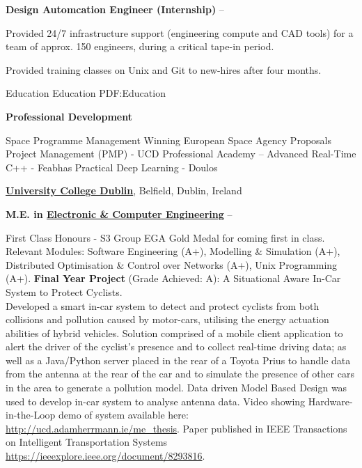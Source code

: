 \documentclass[letterpaper,MMMyyyy,nonstopmode]{simpleresumecv}
\begin{document}
\begin{Body}
\pagebreak

\BulletItem
\textbf{Design Automcation Engineer (Internship)}
\hfill
{} --
\begin{Detail}
\Gap
\SubBulletItem
Provided 24/7 infrastructure support (engineering compute and CAD tools) for a team of approx. 150 engineers, during a critical tape-in period.

\SubBulletItem
Provided training classes on Unix and Git to new-hires after four months.

\end{Detail}


\Section
{Education}
{Education}
{PDF:Education}

\Entry
\textbf{Professional Development}

\Gap
\BulletItem
Space Programme Management
\hfill
{}
\BulletItem
Winning European Space Agency Proposals
\hfill
{}
\BulletItem
Project Management (PMP) - UCD Professional Academy
\hfill
{} --
\BulletItem
Advanced Real-Time C++ - Feabhas
\hfill
{}
\BulletItem
Practical Deep Learning - Doulos
\hfill
{}

\Gap
\Entry
\href{http://www.ucd.ie}
{\textbf{University College Dublin}},
Belfield, Dublin, Ireland

\Gap
\BulletItem
\textbf{
M.E. in
\href{https://www.ucd.ie/eacollege/}
{Electronic \& Computer Engineering}}
\hfill
{} --
\begin{Detail}
\Gap
\SubBulletItem
First Class Honours - S3 Group EGA Gold Medal for coming first in class.
\SubBulletItem
Relevant Modules: Software Engineering (A+), Modelling & Simulation (A+), Distributed Optimisation \& Control over Networks (A+), Unix Programming (A+).
\Gap
\SubBulletItem
\textbf{Final Year Project} (Grade Achieved: A):
A Situational Aware In-Car System to Protect Cyclists.\\
Developed a smart in-car system to detect and protect cyclists from both collisions and pollution caused by motor-cars, utilising the energy actuation abilities of hybrid vehicles. Solution comprised of a mobile client application to alert the driver of the cyclist's presence and to collect real-time driving data; as well as a Java/Python server placed in the rear of a Toyota Prius to handle data from the antenna at the rear of the car and to simulate the presence of other cars in the area to generate a pollution model. Data driven Model Based Design was used to develop in-car system to analyse antenna data. Video showing Hardware-in-the-Loop demo of system available here: \href{http://ucd.adamherrmann.ie/me_thesis/videos/Ch8_HardwareInTheLoopDemo.mp4}
{http://ucd.adamherrmann.ie/me\_thesis}. Paper published in IEEE Transactions on Intelligent Transportation Systems \href{https://ieeexplore.ieee.org/document/8293816/}{https://ieeexplore.ieee.org/document/8293816}.
\end{Detail}


\end{Body}
\end{document}

